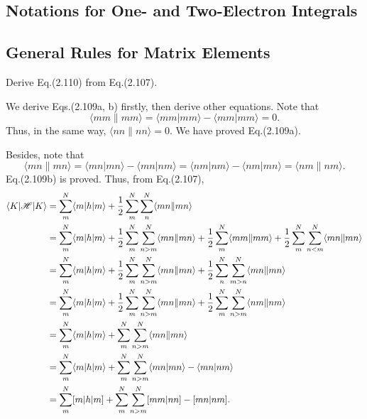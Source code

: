\documentclass[a4paper]{book}
\newcommand\lr[2]{\langle#1\|#2\rangle}
\begin{document}
	\subsection{Notations for One- and Two-Electron Integrals}
	
	\subsection{General Rules for Matrix Elements}
	
	\begin{exercise}
	Derive Eq.(2.110) from Eq.(2.107).
	\end{exercise}
	
	\begin{solution}
	We derive Eqs.(2.109a, b) firstly, then derive other equations. Note that
	\begin{equation}
		\lr{mm}{mm} = \langle mm | mm \rangle - \langle mm | mm \rangle = 0.
	\end{equation}
	Thus, in the same way, $\lr{nn}{nn} = 0$. We have proved Eq.(2.109a).
	
	Besides, note that
	\begin{equation}
		\lr{mn}{mn} = \langle mn | mn \rangle - \langle mn | nm \rangle = \langle nm | nm \rangle - \langle nm | mn \rangle = \lr{nm}{nm}.
	\end{equation}
	Eq.(2.109b) is proved.
	Thus, from Eq.(2.107),
	\begin{align}
		\langle K | \mathscr{H} | K \rangle &= \sum_m^N \langle m | h | m \rangle + \frac{1}{2} \sum_m^N \sum_n^N \lr{mn}{mn} \notag \\
		&= \sum_m^N \langle m | h | m \rangle + \frac{1}{2}\sum_m^N \sum_{n>m}^N \lr{mn}{mn} + \frac{1}{2}\sum_m^N \lr{mm}{mm} + \frac{1}{2}\sum_m^N \sum_{n<m}^N \lr{mn}{mn} \notag \\
		&= \sum_m^N \langle m | h | m \rangle + \frac{1}{2}\sum_m^N \sum_{n>m}^N \lr{mn}{mn} + \frac{1}{2}\sum_n^N \sum_{m>n}^N \lr{mn}{mn} \notag \\
		&= \sum_m^N \langle m | h | m \rangle + \frac{1}{2}\sum_m^N \sum_{n>m}^N \lr{mn}{mn} + \frac{1}{2}\sum_m^N \sum_{n>m}^N \lr{nm}{nm} \notag \\
		&= \sum_m^N \langle m | h | m \rangle + \sum_m^N \sum_{n>m}^N \lr{mn}{mn} \\
		&= \sum_m^N \langle m | h | m \rangle + \sum_m^N \sum_{n>m}^N \langle mn | mn \rangle - \langle mn | nm \rangle \notag \\
		&= \sum_m^N [ m | h | m ] + \sum_m^N \sum_{n>m}^N [ mm | nn ] - [ mn | nm ] .
	\end{align}
	\end{solution}
	
\end{document}
